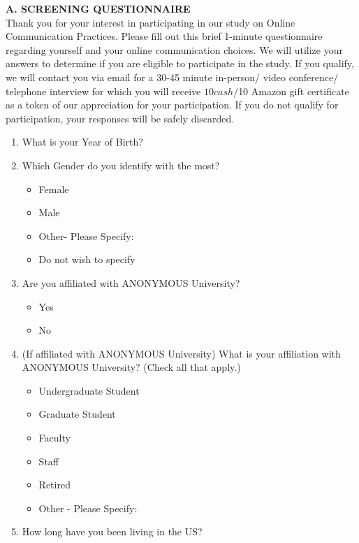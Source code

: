 \begin{appendices}
\textbf{A. SCREENING QUESTIONNAIRE}
\\
Thank you for your interest in participating in our study on Online Communication Practices.   Please fill out this brief 1-minute questionnaire regarding yourself and your online communication choices. We will utilize your answers to determine if you are eligible to participate in the study. If you qualify, we will contact you via email for a 30-45 minute in-person/ video conference/ telephone interview for which you will receive $10 cash/$10 Amazon gift certificate as a token of our appreciation for your participation. If you do not qualify for participation, your responses will be safely discarded. 
\begin{enumerate}
\item What is your Year of Birth?
\item Which Gender do you identify with the most?
\begin{itemize}
\item Female
\item Male
\item Other- Please Specify:
\item Do not wish to specify
\end{itemize}
\item Are you affiliated with ANONYMOUS University?
\begin{itemize}
\item Yes
\item No
\end{itemize}
\item (If affiliated with ANONYMOUS University) What is your affiliation with ANONYMOUS University? (Check all that apply.)
\begin{itemize}
\item Undergraduate Student
\item Graduate Student
\item Faculty
\item Staff
\item Retired
\item Other - Please Specify:
\end{itemize}
\item How long have you been living in the US?
\begin{itemize}

\end{itemize}
\end{enumerate}
\end{appendices}
